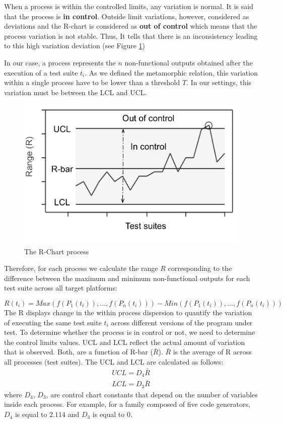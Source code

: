 When a process is within the controlled limits, any variation is normal. It is said that the process is \textbf{in control}. 
Outside limit variations, however, considered as deviations and the R-chart is considered as \textbf{out of control} which means that the process variation is not stable. Thus, It tells that there is an inconsistency leading to this high variation deviation (see Figure \ref{fig:cg-rechart})

In our case, a process represents the $n$ non-functional outputs obtained after the execution of a test suite $t_{i}$. As we defined the metamorphic relation, this variation within a single process have to be lower than a threshold $T$. In our settings, this variation must be between the LCL and UCL.

\begin{figure}[h]
	\centering
	\includegraphics[width=0.6\linewidth]{chapitre4/fig/rchat}
	\caption{The R-Chart process}
	\label{fig:cg-rechart}
\end{figure}

Therefore, for each process we calculate the range $R$ corresponding to the difference between the maximum and minimum non-functional outputs for each test suite across all target platforms:

\begin{equation}
R(t_{i})= Max(f(P_{1}(t_{i})),..., f(P_{n}(t_{i}))) - Min(f(P_{1}(t_{i})),..., f(P_{n}(t_{i})))  
\end{equation}
The R displays change in the within process dispersion to quantify the variation of executing the same test suite $t_{i}$ across different versions of the program under test.
To determine whether the process is in control or not, we need to determine the control limits values. UCL and LCL reflect the actual amount of variation that is observed. Both, are a function of R-bar ($\bar{R}$). $\bar{R}$ is the average of R across all processes (test suites).
The UCL and LCL are calculated as follows:
\begin{equation}
\begin{split} 
UCL = D_{4}\bar{R}\\
LCL = D_{3}\bar{R}
\end{split} 
\label{eqUCL}
\end{equation}
where $D_{4}$, $D_{3}$, are control chart constants that depend on the number of variables inside each process. For example,  for a family composed of five code generators, $D_{4}$ is equal to $2.114$ and $D_{3}$ is equal to 0. 

